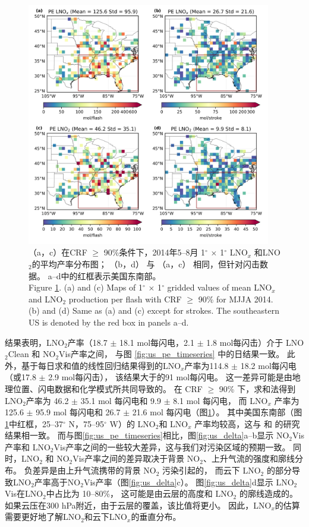 \begin{figure}[H]
\centering
\includegraphics[width=0.95\textwidth]{./figures/us_pe_sum.png}
\caption{（a，c）在CRF $\geq$ 90\%条件下，2014年5--8月 1$^{\circ}$ $\times$ 1$^{\circ}$ LNO$_x$ 和LNO$_2$的平均产率分布图；
     （b，d） 与 （a，c） 相同，但针对闪击数据。
     a--d中的红框表示美国东南部。\\
     Figure \ref{fig:us_pe_sum}. (a) and (c) Maps of 1$^{\circ}$ $\times$ 1$^{\circ}$ gridded values of mean LNO$_x$
    and LNO$_2$ production per flash with CRF $\geq$ 90\% for MJJA 2014.
    (b) and (d) Same as (a) and (c) except for strokes.
    The southeastern US is denoted by the red box in panels a--d.
}
\label{fig:us_pe_sum}
\end{figure}


结果表明，LNO$_2$产率（18.7 $\pm$ 18.1 mol每闪电，2.1 $\pm$ 1.8 mol每闪击）介于 LNO$_2$Clean 和 NO$_2$Vis产率之间，
与图 \ref{fig:us_pe_timeseries} 中的日结果一致。
此外，基于每日求和值的线性回归结果得到的LNO$_x$产率为114.8 $\pm$ 18.2 mol每闪电（或17.8 $\pm$ 2.9 mol每闪击），
该结果大于\citet{Pickering.2016}的91 mol每闪电。
这一差异可能是由地理位置、闪电数据和化学模式所共同导致的。
在 CRF $\geq$ 90\% 下，求和法得到LNO$_2$产率为 46.2 $\pm$ 35.1 mol 每闪电和 9.9 $\pm$ 8.1 mol 每闪电，
而 LNO$_x$ 产率为 125.6 $\pm$ 95.9 mol 每闪电和 26.7 $\pm$ 21.6 mol 每闪电（图\ref{fig:us_pe_sum}）。
其中美国东南部（图\ref{fig:us_pe_sum}中红框，25--37$^{\circ}$ N，75--95$^{\circ}$ W）的 LNO$_2$和 LNO$_x$ 产率均较高，这与\citet{Lapierre.2020} 和 \citet{Bucsela.2019}的研究结果相一致。
而与图\ref{fig:us_pe_timeseries}相比，图\ref{fig:us_delta}a--b显示
NO$_2$Vis产率和 LNO$_2$Vis产率之间的一些较大差异，这与我们对污染区域的预期一致。
同时，LNO$_2$ 和 NO$_2$Vis产率之间的差异取决于背景 NO$_2$、上升气流的强度和廓线分布。
负差异是由上升气流携带的背景 NO$_2$ 污染引起的，
而云下 LNO$_2$ 的部分导致LNO$_2$产率高于NO$_2$Vis产率（图\ref{fig:us_delta}c）。
图\ref{fig:us_delta}d显示 LNO$_2$Vis在LNO$_2$中占比为 10--80\%，
这可能是由云层的高度和 LNO$_2$ 的廓线造成的。
如果云压在300 hPa附近，由于云层的覆盖，该比值将更小。
因此，LNO$_x$的估算需要更好地了解LNO$_2$和云下LNO$_x$的垂直分布。

